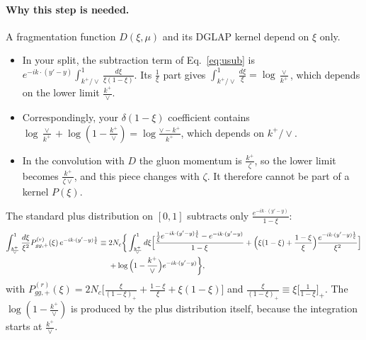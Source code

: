 \documentclass[10pt]{article}
\numberwithin{equation}{section}
\newcommand{\ph}{e^{-ik\cdot(y'-y)\frac{1}{\xi}}}
\newcommand{\phone}{e^{-ik\cdot(y'-y)}}
\begin{document}
\paragraph{Why this step is needed.} A fragmentation function $D(\xi,\mu)$ and its DGLAP kernel depend on $\xi$ only.
\begin{itemize}
\item In your split, the subtraction term of Eq.~\eqref{eq:usub} is $\phone\int_{k^+/\vee}^1\frac{d\xi}{\xi(1-\xi)}$. Its $\frac1\xi$ part gives $\int_{k^+/\vee}^1\frac{d\xi}{\xi}=\log\frac{\vee}{k^+}$, which depends on the lower limit $\frac{k^+}{\vee}$.
\item Correspondingly, your $\delta(1-\xi)$ coefficient contains $\log\frac{\vee}{k^+}+\log(1-\frac{k^+}{\vee})=\log\frac{\vee-k^+}{k^+}$, which depends on $k^+/\vee$.
\item In the convolution with $D$ the gluon momentum is $\frac{k^+}{\zeta}$, so the lower limit becomes $\frac{k^+}{\zeta\vee}$, and this piece changes with $\zeta$. It therefore cannot be part of a kernel $P(\xi)$.
\end{itemize}
The standard plus distribution on $[0,1]$ subtracts only $\frac{\phone}{1-\xi}$:
\begin{align}
\int_{\frac{k^+}{\vee}}^1\frac{d\xi}{\xi^2}P^{(r)}_{gg,+}(\xi)\,\ph\equiv{}&2N_c\bigg\{\int_{\frac{k^{+}}{\vee}}^{1}d\xi\Big[\frac{\frac1\xi\ph-\phone}{1-\xi}+\Big(\xi(1-\xi)+\frac{1-\xi}{\xi}\Big)\frac{\ph}{\xi^2}\Big]\notag\\
&+\log\Big(1-\frac{k^+}{\vee}\Big)\phone\bigg\},
\label{eq:std}
\end{align}
with $P^{(r)}_{gg,+}(\xi)=2N_c\big[\frac{\xi}{(1-\xi)_+}+\frac{1-\xi}{\xi}+\xi(1-\xi)\big]$ and $\frac{\xi}{(1-\xi)_+}\equiv\xi\big[\frac{1}{1-\xi}\big]_+$. The $\log(1-\frac{k^+}{\vee})$ is produced by the plus distribution itself, because the integration starts at $\frac{k^+}{\vee}$.
\end{document}
